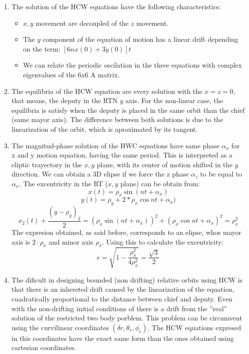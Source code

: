 \documentclass[a4paper]{article}
\begin{document}
\begin{enumerate}[label=\emph{\alph*)}]
  \item The solution of the HCW equations have the following characteristics:
    \begin{itemize}
      \item $x,y$ movement are decoupled of the $z$ movement.
      \item The $y$ component of the equation of motion has a linear drift depending on the term: $[6nx(0)+3\dot{y}(0)]t$
      \item We can relate the periodic oscilation in the three equations with complex eigenvalues of the 6x6 A matrix.
    \end{itemize}
  \item The equilibria of the HCW equation are every solution with the $x=z=0$, that means, the deputy in the RTN $y$ axis. For the non-linear case, the equilibria is satisfy when the deputy is placed in the same orbit than the chief (same mayor axis). The difference between both solutions is due to the linearization of the orbit, which is aproximated by its tangent.
  \item The magnitud-phase solution of the HWC equations have same phase $\alpha_x$  for x and y motion equation, having the same period. This is interpreted as a eliptic trayectory in the $x,y$ plane, with its center of motion shifted in the $y$ direction. We can obtain a 3D elipse if we force the z phase $\alpha_z$ to be equal to $\alpha_x$. The excentricity in the RT ($x,y$ plane) can be obtain from:
    \[ x(t)=\rho_x\sin{(nt+\alpha_x)}\]
    \[y(t)=\rho_y+2*\rho_x\cos{nt+\alpha_x)}\]
    \[x_2(t)+\frac{{(y-\rho_y)}_2}{2}=(\rho_x\sin{(nt+\alpha_x)})^2+(\rho_x\cos{nt+\alpha_x})^2=\rho_x^2\]
  The expresion obtained, as said before, corresponds to an elipse, whos mayor axis is $2\cdot \rho_x$ and minor axis $\rho_x$. Using this to calculate the excentricity:
    \[e=\sqrt{1-\frac{\rho_x^2}{4\rho_x^2}}=\frac{\sqrt{3}}{2}\]
  \item The dificult in designing bounded (non drifting) relative orbits using HCW is that there is an inhereted drift caused by the linearization of the equation, cuadratically proportional to the distance between chief and deputy. Even with the non-drifting initial conditions of there is a drift from the ''real'' solution of the restricted two body porblem. This problem can be circumvent using the curvilinear coordinates $(\delta r,\theta_r,\phi_r)$. The HCW equations expresed in this coordinates have the exact same form than the ones obtained using cartesian coordinates.

\end{enumerate}
\end{document}
